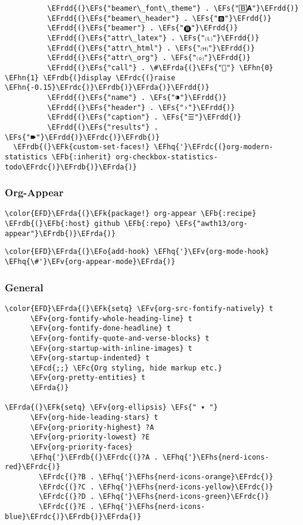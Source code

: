 \documentclass[12pt]{article}
\theoremstyle{plain}%
\theoremstyle{definition}
\theoremstyle{remark}
\newcommand{\EFc}[1]{\textcolor{EFc}{#1}} %
\newcommand{\EFcd}[1]{\textcolor{EFcd}{#1}} %
\newcommand{\EFs}[1]{\textcolor{EFs}{#1}} %
\newcommand{\EFk}[1]{\textcolor{EFk}{#1}} %
\newcommand{\EFb}[1]{\textcolor{EFb}{#1}} %
\newcommand{\EFv}[1]{\textcolor{EFv}{#1}} %
\newcommand{\EFo}[1]{\textcolor{EFo}{#1}} %
\newcommand{\EFhn}[1]{\textcolor{EFhn}{\textbf{#1}}} %
\newcommand{\EFhq}[1]{\textcolor{EFhq}{#1}} %
\newcommand{\EFhs}[1]{\textcolor{EFhs}{#1}} %
\newcommand{\EFrda}[1]{\textcolor{EFrda}{#1}} %
\newcommand{\EFrdb}[1]{\textcolor{EFrdb}{#1}} %
\newcommand{\EFrdc}[1]{\textcolor{EFrdc}{#1}} %
\newcommand{\EFrdd}[1]{\textcolor{EFrdd}{#1}} %
\begin{document}
\begin{Code}
\begin{Verbatim}
          \EFrdd{(}\EFs{"beamer\_font\_theme"} . \EFs{"🄱𝐀"}\EFrdd{)}
          \EFrdd{(}\EFs{"beamer\_header"} . \EFs{"🅱"}\EFrdd{)}
          \EFrdd{(}\EFs{"beamer"} . \EFs{"🅑"}\EFrdd{)}
          \EFrdd{(}\EFs{"attr\_latex"} . \EFs{"🄛"}\EFrdd{)}
          \EFrdd{(}\EFs{"attr\_html"} . \EFs{"🄗"}\EFrdd{)}
          \EFrdd{(}\EFs{"attr\_org"} . \EFs{"⒪"}\EFrdd{)}
          \EFrdd{(}\EFs{"call"} . \#\EFrda{(}\EFs{""} \EFhn{0} \EFhn{1} \EFrdb{(}display \EFrdc{(}raise \EFhn{-0.15}\EFrdc{)}\EFrdb{)}\EFrda{)}\EFrdd{)}
          \EFrdd{(}\EFs{"name"} . \EFs{"⁍"}\EFrdd{)}
          \EFrdd{(}\EFs{"header"} . \EFs{"›"}\EFrdd{)}
          \EFrdd{(}\EFs{"caption"} . \EFs{"☰"}\EFrdd{)}
          \EFrdd{(}\EFs{"results"} . \EFs{"🠶"}\EFrdd{)}\EFrdc{)}\EFrdb{)}
  \EFrdb{(}\EFk{custom-set-faces!} \EFhq{'}\EFrdc{(}org-modern-statistics \EFb{:inherit} org-checkbox-statistics-todo\EFrdc{)}\EFrdb{)}\EFrda{)}

\end{Verbatim}
\end{Code}
\subsubsection{Org-Appear}
\label{sec:org14ad5b9}
\begin{Code}
\begin{Verbatim}
\color{EFD}\EFrda{(}\EFk{package!} org-appear \EFb{:recipe} \EFrdb{(}\EFb{:host} github \EFb{:repo} \EFs{"awth13/org-appear"}\EFrdb{)}\EFrda{)}
\end{Verbatim}
\end{Code}
\begin{Code}
\begin{Verbatim}
\color{EFD}\EFrda{(}\EFo{add-hook} \EFhq{'}\EFv{org-mode-hook} \EFhq{\#'}\EFv{org-appear-mode}\EFrda{)}
\end{Verbatim}
\end{Code}
\subsubsection{General}
\label{sec:orgbbfd5c7}
\begin{Code}
\begin{Verbatim}
\color{EFD}\EFrda{(}\EFk{setq} \EFv{org-src-fontify-natively} t
      \EFv{org-fontify-whole-heading-line} t
      \EFv{org-fontify-done-headline} t
      \EFv{org-fontify-quote-and-verse-blocks} t
      \EFv{org-startup-with-inline-images} t
      \EFv{org-startup-indented} t
      \EFcd{;;} \EFc{Org styling, hide markup etc.}
      \EFv{org-pretty-entities} t
      \EFrda{)}

\EFrda{(}\EFk{setq} \EFv{org-ellipsis} \EFs{" ▾ "}
      \EFv{org-hide-leading-stars} t
      \EFv{org-priority-highest} ?A
      \EFv{org-priority-lowest} ?E
      \EFv{org-priority-faces}
      \EFhq{'}\EFrdb{(}\EFrdc{(}?A . \EFhq{'}\EFhs{nerd-icons-red}\EFrdc{)}
        \EFrdc{(}?B . \EFhq{'}\EFhs{nerd-icons-orange}\EFrdc{)}
        \EFrdc{(}?C . \EFhq{'}\EFhs{nerd-icons-yellow}\EFrdc{)}
        \EFrdc{(}?D . \EFhq{'}\EFhs{nerd-icons-green}\EFrdc{)}
        \EFrdc{(}?E . \EFhq{'}\EFhs{nerd-icons-blue}\EFrdc{)}\EFrdb{)}\EFrda{)}
\end{Verbatim}
\end{Code}
\end{document}
